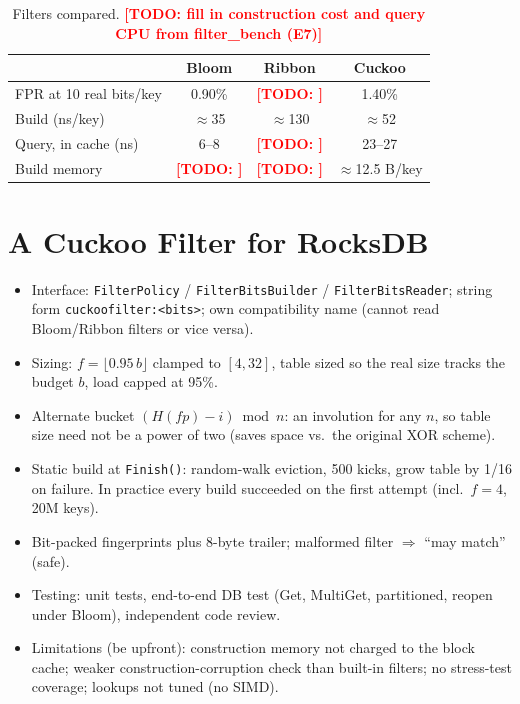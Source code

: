 \documentclass[sigconf,nonacm]{acmart}
\newcommand{\todo}[1]{\textcolor{red}{\textbf{[TODO: #1]}}}
\begin{document}
\begin{table}[t]
  \caption{Filters compared. \todo{fill in construction cost and query CPU
  from filter\_bench (E7)}}
  \label{tab:filters}
  \small
  \begin{tabular}{lccc}
    \toprule
    & Bloom & Ribbon & Cuckoo \\
    \midrule
    FPR at 10 real bits/key & 0.90\% & \todo{} & 1.40\% \\
    Build (ns/key) & $\approx$35 & $\approx$130 & $\approx$52 \\
    Query, in cache (ns) & 6--8 & \todo{} & 23--27 \\
    Build memory & \todo{} & \todo{} & $\approx$12.5 B/key \\
    \bottomrule
  \end{tabular}
\end{table}

\section{A Cuckoo Filter for RocksDB}
\label{sec:cuckoo}

\begin{itemize}
  \item Interface: \texttt{FilterPolicy} / \texttt{FilterBitsBuilder} /
    \texttt{FilterBitsReader}; string form \texttt{cuckoofilter:<bits>};
    own compatibility name (cannot read Bloom/Ribbon filters or vice versa).
  \item Sizing: $f = \lfloor 0.95\, b \rfloor$ clamped to $[4,32]$, table
    sized so the real size tracks the budget $b$, load capped at 95\%.
  \item Alternate bucket $(H(fp) - i) \bmod n$: an involution for any $n$,
    so table size need not be a power of two (saves space vs.\ the original
    XOR scheme).
  \item Static build at \texttt{Finish()}: random-walk eviction, 500 kicks,
    grow table by 1/16 on failure. In practice every build succeeded on the
    first attempt (incl.\ $f=4$, 20M keys).
  \item Bit-packed fingerprints plus 8-byte trailer; malformed filter
    $\Rightarrow$ ``may match'' (safe).
  \item Testing: unit tests, end-to-end DB test (Get, MultiGet, partitioned,
    reopen under Bloom), independent code review.
  \item Limitations (be upfront): construction memory not charged to the
    block cache; weaker construction-corruption check than built-in filters;
    no stress-test coverage; lookups not tuned (no SIMD).
\end{itemize}
\end{document}
